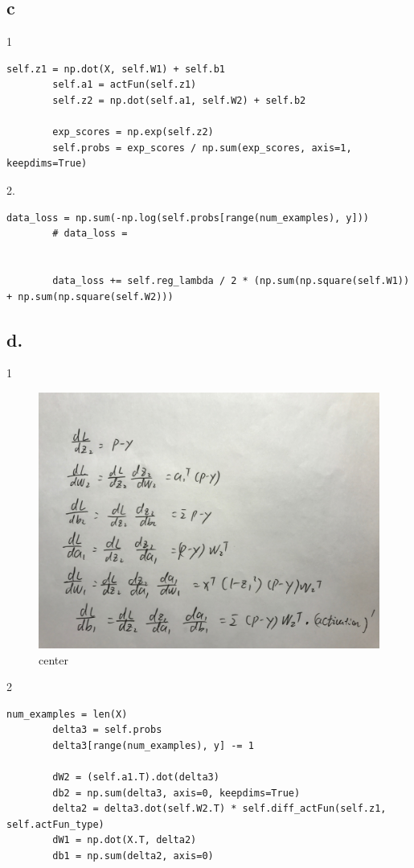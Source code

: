 \documentclass[12pt]{article}
\begin{document}
\subsection{c}
1
\begin{lstlisting}
self.z1 = np.dot(X, self.W1) + self.b1
        self.a1 = actFun(self.z1)
        self.z2 = np.dot(self.a1, self.W2) + self.b2

        exp_scores = np.exp(self.z2)
        self.probs = exp_scores / np.sum(exp_scores, axis=1, keepdims=True)
\end{lstlisting}
2.
\begin{lstlisting}
data_loss = np.sum(-np.log(self.probs[range(num_examples), y]))
        # data_loss =


        data_loss += self.reg_lambda / 2 * (np.sum(np.square(self.W1)) + np.sum(np.square(self.W2)))
 \end{lstlisting}       



\subsection{d.}
1 
\begin{figure}[H]
  \caption{center}
  \centering
    \includegraphics[scale=0.2]{b3.jpg}
\end{figure}
2
 \begin{lstlisting}  
num_examples = len(X)
        delta3 = self.probs
        delta3[range(num_examples), y] -= 1

        dW2 = (self.a1.T).dot(delta3)
        db2 = np.sum(delta3, axis=0, keepdims=True)
        delta2 = delta3.dot(self.W2.T) * self.diff_actFun(self.z1, self.actFun_type)
        dW1 = np.dot(X.T, delta2)
        db1 = np.sum(delta2, axis=0)
 \end{lstlisting}  
 
\end{document}

